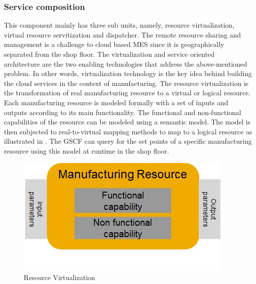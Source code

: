 \documentclass[10pt,conference,compsocconf]{IEEEtran}
\begin{document}
\subsubsection{Service composition}
This component mainly has three sub units, namely, resource virtualization, virtual resource servitization and dispatcher.
The remote resource sharing and management is a challenge to cloud based MES since it is geographically separated from the shop floor. The virtualization and service oriented architecture are the two enabling technologies that address the above-mentioned problem. In other words, virtualization technology is the key idea behind building the cloud services in the context of manufacturing. The resource virtualization is the transformation of real manufacturing resource to a virtual or logical resource. Each manufacturing resource is modeled formally with a set of inputs and outputs according to its main functionality. The functional and non-functional capabilities of the resource can be modeled using a semantic model. The model is then subjected to real-to-virtual mapping methods to map to a logical resource as illustrated in .  The GSCF can query for the set points of a specific manufacturing resource using this model at runtime in the shop floor.
\begin{figure} [h]
\centering
\includegraphics [scale=0.3]{"Figures/Resource_Virtualization"}
\caption{Resource Virtualization}
\label{fig:Resource_Virtualization}
\end{figure}
\end{document}
